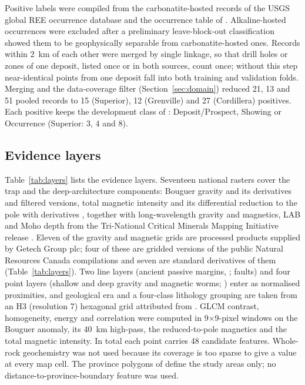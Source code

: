 \documentclass[pdflatex,sn-apa]{sn-jnl}
\begin{document}
Positive labels were compiled from the carbonatite-hosted records of the USGS global REE occurrence database \citep{Orris2018} and the occurrence table of \citet{Parsa2024}. Alkaline-hosted occurrences were excluded after a preliminary leave-block-out classification showed them to be geophysically separable from carbonatite-hosted ones. Records within 2~km of each other were merged by single linkage, so that drill holes or zones of one deposit, listed once or in both sources, count once; without this step near-identical points from one deposit fall into both training and validation folds. Merging and the data-coverage filter (Section~\ref{sec:domain}) reduced 21, 13 and 51 pooled records to 15 (Superior), 12 (Grenville) and 27 (Cordillera) positives. Each positive keeps the development class of \citet{Parsa2024}: Deposit/Prospect, Showing or Occurrence (Superior: 3, 4 and 8).

\subsection{Evidence layers}\label{sec:layers}

Table~\ref{tab:layers} lists the evidence layers. Seventeen national rasters cover the trap and the deep-architecture components: Bouguer gravity and its derivatives and filtered versions, total magnetic intensity and its differential reduction to the pole with derivatives \citep{Jobin2017,Miles2016}, together with long-wavelength gravity and magnetics, LAB and Moho depth from the Tri-National Critical Minerals Mapping Initiative release \citep{McCafferty2023}. Eleven of the gravity and magnetic grids are processed products supplied by Getech Group plc; four of these are gridded versions of the public Natural Resources Canada compilations and seven are standard derivatives of them (Table~\ref{tab:layers}). Two line layers (ancient passive margins, \citealp{BradleyDC2008}; faults) and four point layers (shallow and deep gravity and magnetic worms; \citealp{McCafferty2023}) enter as normalised proximities, and geological era and a four-class lithology grouping are taken from an H3 (resolution 7) hexagonal grid attributed from \citet{Wheeler1996}. GLCM contrast, homogeneity, energy and correlation were computed in 9$\times$9-pixel windows on the Bouguer anomaly, its 40~km high-pass, the reduced-to-pole magnetics and the total magnetic intensity. In total each point carries 48 candidate features. Whole-rock geochemistry was not used because its coverage is too sparse to give a value at every map cell. The province polygons of \citet{Wheeler1996} define the study areas only; no distance-to-province-boundary feature was used.
\end{document}
